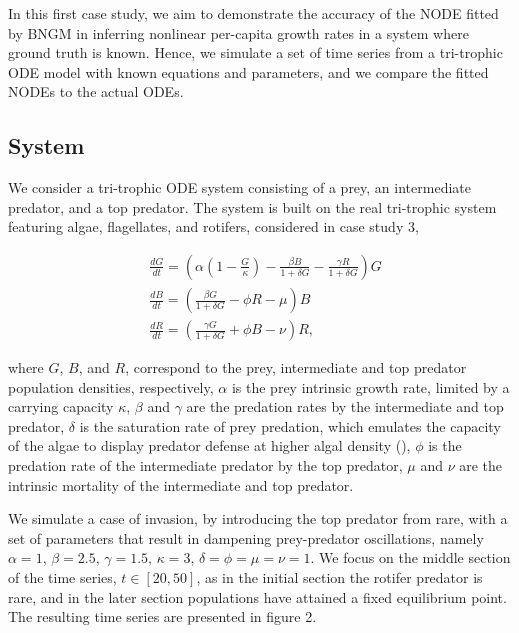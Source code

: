 \documentclass[11pt, oneside]{article}
\begin{document}
In this first case study, we aim to demonstrate the accuracy of the NODE fitted by BNGM in inferring nonlinear per-capita growth rates in a system where ground truth is known.
Hence, we simulate a set of time series from a tri-trophic ODE model with known equations and parameters, and we compare the fitted NODEs to the actual ODEs.

\subsection{System}

We consider a tri-trophic ODE system consisting of a prey, an intermediate predator, and a top predator.
The system is built on the real tri-trophic system featuring algae, flagellates, and rotifers, considered in case study 3,

\vspace{-0.5cm}
\begin{equation} \begin{aligned}
    & \frac{dG}{dt} = \left( \alpha \left(1-\frac{G}{\kappa}\right) - \frac{\beta B}{1+\delta G} - \frac{\gamma R}{1+\delta G} \right) G\\
    & \frac{dB}{dt} = \left( \frac{\beta G}{1+\delta G} - \phi R - \mu \right) B \\
	& \frac{dR}{dt} = \left( \frac{\gamma G}{1+\delta G} + \phi B - \nu \right) R,
\end{aligned} \end{equation}

where $G$, $B$, and $R$, correspond to the prey, intermediate and top predator population densities, respectively,
$\alpha$ is the prey intrinsic growth rate, limited by a carrying capacity $\kappa$, 
$\beta$ and $\gamma$ are the predation rates by the intermediate and top predator,
$\delta$ is the saturation rate of prey predation, which emulates the capacity of the algae to display predator defense at higher algal density (\cite{Hiltunen2013}),
$\phi$ is the predation rate of the intermediate predator by the top predator,
$\mu$ and $\nu$ are the intrinsic mortality of the intermediate and top predator.

We simulate a case of invasion, by introducing the top predator from rare, with a set of parameters that result in dampening prey-predator oscillations, namely $\alpha = 1$, $\beta = 2.5$, $\gamma = 1.5$, $\kappa = 3$, $\delta = \phi = \mu = \nu = 1$.
We focus on the middle section of the time series, $t \in [20,50]$, as in the initial section the rotifer predator is rare, and in the later section populations have attained a fixed equilibrium point.
The resulting time series are presented in figure 2.
\end{document}
